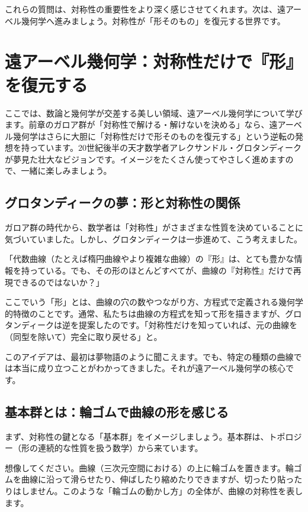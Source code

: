 \documentclass[dvipdfmx,12pt,a4paper]{jsarticle}
\begin{document}
これらの質問は、対称性の重要性をより深く感じさせてくれます。次は、遠アーベル幾何学へ進みましょう。対称性が「形そのもの」を復元する世界です。

\section{遠アーベル幾何学：対称性だけで『形』を復元する}

ここでは、数論と幾何学が交差する美しい領域、遠アーベル幾何学について学びます。前章のガロア群が「対称性で解ける・解けないを決める」なら、遠アーベル幾何学はさらに大胆に「対称性だけで形そのものを復元する」という逆転の発想を持っています。20世紀後半の天才数学者アレクサンドル・グロタンディークが夢見た壮大なビジョンです。イメージをたくさん使ってやさしく進めますので、一緒に楽しみましょう。

\subsection{グロタンディークの夢：形と対称性の関係}

ガロア群の時代から、数学者は「対称性」がさまざまな性質を決めていることに気づいていました。しかし、グロタンディークは一歩進めて、こう考えました。

「代数曲線（たとえば楕円曲線やより複雑な曲線）の『形』は、とても豊かな情報を持っている。でも、その形のほとんどすべてが、曲線の『対称性』だけで再現できるのではないか？」

ここでいう「形」とは、曲線の穴の数やつながり方、方程式で定義される幾何学的特徴のことです。通常、私たちは曲線の方程式を知って形を描きますが、グロタンディークは逆を提案したのです。「対称性だけを知っていれば、元の曲線を（同型を除いて）完全に取り戻せる」と。

このアイデアは、最初は夢物語のように聞こえます。でも、特定の種類の曲線では本当に成り立つことがわかってきました。それが遠アーベル幾何学の核心です。

\subsection{基本群とは：輪ゴムで曲線の形を感じる}

まず、対称性の鍵となる「基本群」をイメージしましょう。基本群は、トポロジー（形の連続的な性質を扱う数学）から来ています。

想像してください。曲線（三次元空間における）の上に輪ゴムを置きます。輪ゴムを曲線に沿って滑らせたり、伸ばしたり縮めたりできますが、切ったり貼ったりはしません。このような「輪ゴムの動かし方」の全体が、曲線の対称性を表します。
\end{document}
